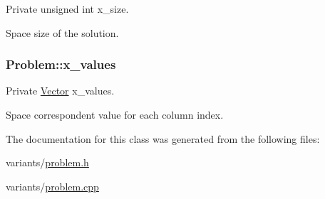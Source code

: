 Private unsigned int x\+\_\+size. 

Space size of the solution. 
\subsubsection[{\texorpdfstring{x\+\_\+values}{x_values}}]{ Problem\+::x\+\_\+values\hspace{0.3cm}{\ttfamily [private]}}\hypertarget{classProblem_a2b451feb5a8d7f3e870e2b5e607f0b7c}{}\label{classProblem_a2b451feb5a8d7f3e870e2b5e607f0b7c}


Private \hyperlink{classVector}{Vector} x\+\_\+values. 

Space correspondent value for each column index. 

The documentation for this class was generated from the following files\+:\begin{DoxyCompactItemize}
\item 
variants/\hyperlink{problem_8h}{problem.\+h}\item 
variants/\hyperlink{problem_8cpp}{problem.\+cpp}\end{DoxyCompactItemize}
